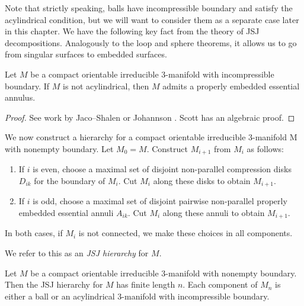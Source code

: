 Note that strictly speaking, balls have incompressible boundary and satisfy the
acylindrical condition, but we will want to consider them as a separate case
later in this chapter. We have the following key fact from the theory of JSJ
decompositions.  Analogously to the loop and sphere theorems, it allows us to
go from singular surfaces to embedded surfaces.

\begin{thm}

Let $M$ be a compact orientable irreducible $3$-manifold with incompressible
boundary. If $M$ is not acylindrical, then $M$ admits a properly embedded
essential annulus.

\end{thm}

\begin{proof}

See work by Jaco--Shalen \cite{JacoShalen} or Johannson \cite{Johannson}. Scott
\cite{Scottannulus} has an algebraic proof.

\end{proof}

We now construct a hierarchy for a compact orientable irreducible $3$-manifold
M with nonempty boundary.  Let $M_0 = M$.  Construct $M_{i+1}$ from $M_i$ as
follows:

\begin{enumerate}

\item If $i$ is even, choose a maximal set of disjoint non-parallel compression
disks $D_{ik}$ for the boundary of $M_i$. Cut $M_i$ along these disks to obtain
$M_{i+1}$.

\item If $i$ is odd, choose a maximal set of disjoint pairwise non-parallel
properly embedded essential annuli $A_{ik}$. Cut $M_i$ along these annuli to
obtain $M_{i+1}$.

\end{enumerate}

In both cases, if $M_i$ is not connected, we make these choices in all
components.

\begin{defn}

We refer to this as an \emph{JSJ hierarchy} for $M$.

\end{defn}

\begin{lemma}

Let $M$ be a compact orientable irreducible $3$-manifold with nonempty
boundary.  Then the JSJ hierarchy for $M$ has finite length $n$. Each
component of $M_n$ is either a ball or an acylindrical $3$-manifold with
incompressible boundary.

\end{lemma}

